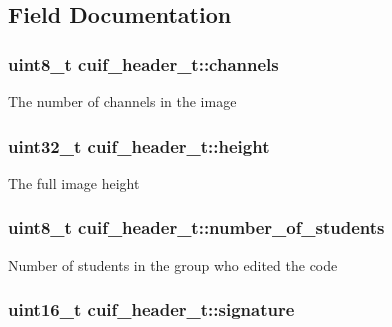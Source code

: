 \subsection{Field Documentation}
\hypertarget{structcuif__header__t_ac9628a6b1399d93a0bc2f71e00dd6847}{
\subsubsection[{channels}]{\setlength{\rightskip}{0pt plus 5cm}uint8\+\_\+t cuif\+\_\+header\+\_\+t\+::channels}}\label{structcuif__header__t_ac9628a6b1399d93a0bc2f71e00dd6847}
The number of channels in the image \hypertarget{structcuif__header__t_a1a9be7e2655bacdc1854c0782e189bce}{
\subsubsection[{height}]{\setlength{\rightskip}{0pt plus 5cm}uint32\+\_\+t cuif\+\_\+header\+\_\+t\+::height}}\label{structcuif__header__t_a1a9be7e2655bacdc1854c0782e189bce}
The full image height \hypertarget{structcuif__header__t_a908fcf853f733fa7eb462a2e19bdc9b1}{
\subsubsection[{number\+\_\+of\+\_\+students}]{\setlength{\rightskip}{0pt plus 5cm}uint8\+\_\+t cuif\+\_\+header\+\_\+t\+::number\+\_\+of\+\_\+students}}\label{structcuif__header__t_a908fcf853f733fa7eb462a2e19bdc9b1}
Number of students in the group who edited the code \hypertarget{structcuif__header__t_a99e2254e55e8d91e2ccbab0d0325395e}{
\subsubsection[{signature}]{\setlength{\rightskip}{0pt plus 5cm}uint16\+\_\+t cuif\+\_\+header\+\_\+t\+::signature}}\label{structcuif__header__t_a99e2254e55e8d91e2ccbab0d0325395e}
